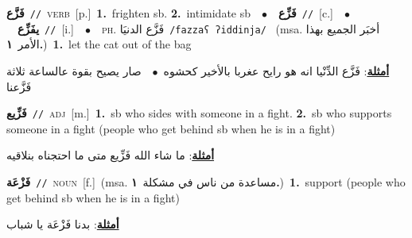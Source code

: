 \documentclass[10pt,a4paper,twoside]{article} %
\begin{document}
\begin{multicols}{2}
{\setlength\topsep{0pt}\textbf{\foreignlanguage{arabic}{فَزَّع}}\ {\color{gray}\texttt{//}\color{black}}\ \textsc{verb}\ [p.]\ \textbf{1.}~frighten sb.  \textbf{2.}~intimidate sb\ \ $\bullet$\ \ \setlength\topsep{0pt}\textbf{\foreignlanguage{arabic}{فَزِّع}}\ {\color{gray}\texttt{//}\color{black}}\ [c.]\ \ $\bullet$\ \ \setlength\topsep{0pt}\textbf{\foreignlanguage{arabic}{يفَزِّع}}\ {\color{gray}\texttt{//}\color{black}}\ [i.]\ \ $\bullet$\ \ \textsc{ph.} \color{gray} \foreignlanguage{arabic}{فَزَّع الدنيَا}\color{black}\ {\color{gray}\texttt{/{\sffamily fazzaʕ ʔiddinja}/}\color{black}}\ \color{gray} (msa. \foreignlanguage{arabic}{أخبَر الجميع بهذا الأمر}~\foreignlanguage{arabic}{\textbf{١.}})\color{black}\ \textbf{1.}~let the cat out of the bag\  \begin{flushright}\color{gray}\foreignlanguage{arabic}{\textbf{\underline{\foreignlanguage{arabic}{أمثلة}}}: فَزَّع الدِّنْيا انه هو رايح عغربا بالأخير كحشوه\ $\bullet$\ \  صار يصيح بقوة عالساعة ثلاثة فَزَّعنا}\end{flushright}\color{black}} \vspace{2mm}

{\setlength\topsep{0pt}\textbf{\foreignlanguage{arabic}{فَزِّيع}}\ {\color{gray}\texttt{//}\color{black}}\ \textsc{adj}\ [m.]\ \textbf{1.}~sb who sides with someone in a fight.  \textbf{2.}~sb who supports someone in a fight (people who get behind sb when he is in a fight)\  \begin{flushright}\color{gray}\foreignlanguage{arabic}{\textbf{\underline{\foreignlanguage{arabic}{أمثلة}}}: ما شاء الله فَزِّيع متى ما احتجناه بنلاقيه}\end{flushright}\color{black}} \vspace{2mm}

{\setlength\topsep{0pt}\textbf{\foreignlanguage{arabic}{فَزْعَة}}\ {\color{gray}\texttt{//}\color{black}}\ \textsc{noun}\ [f.]\ \color{gray}(msa. \foreignlanguage{arabic}{مساعدة من ناس في مشكلة}~\foreignlanguage{arabic}{\textbf{١.}})\color{black}\ \textbf{1.}~support (people who get behind sb when he is in a fight)\  \begin{flushright}\color{gray}\foreignlanguage{arabic}{\textbf{\underline{\foreignlanguage{arabic}{أمثلة}}}: بدنا فَزْعَة يا شباب}\end{flushright}\color{black}} \vspace{2mm}


\end{multicols}
\end{document}
